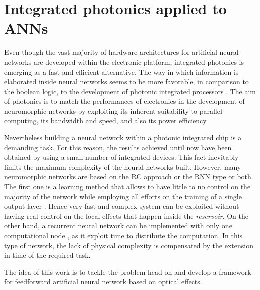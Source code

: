 \clearpage
\section{Integrated photonics applied to ANNs}
\label{sec:Integrated_photonics_applied_to_ANNs}
Even though the vast majority of hardware architectures for artificial neural networks are developed within the electronic platform, integrated photonics is emerging as a fast and efficient alternative.
The way in which information is elaborated inside neural networks seems to be more favorable, in comparison to the boolean logic, to the development of photonic integrated processors \cite{shastri2017emergence}.
The aim of photonics is to match the performances of electronics in the development of neuromorphic networks by exploiting its inherent suitability to parallel computing, its bandwidth and speed, and also its power efficiency.

Nevertheless building a neural network within a photonic integrated chip is a demanding task.
For this reason, the results achieved until now have been obtained by using a small number of integrated devices.
This fact inevitably limits the maximum complexity of the neural networks built.
However, many neuromorphic networks are based on the \acf{RC} approach or the \acf{RNN} type or both.
The first one is a learning method that allows to have little to no control on the majority of the network while employing all efforts on the training of a single output layer \cite{van2017advances, haynes2015reservoir}.
Hence very fast and complex system can be exploited without having real control on the local effects that happen inside the \textit{reservoir}.
On the other hand, a recurrent neural network can be implemented with only one computational node \cite{dejonckheere2014all, haynes2015reservoir}, as it exploit time to distribute the computation.
In this type of network, the lack of physical complexity is compensated by the extension in time of the required task.

The idea of this work is to tackle the problem head on and develop a framework for feedforward artificial neural network based on optical effects.

